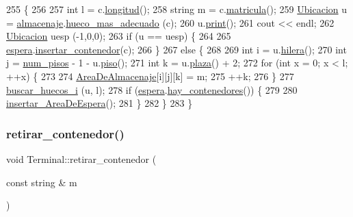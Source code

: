 \begin{DoxyCode}
255                                                        \{
256     
257     \textcolor{keywordtype}{int} l = c.\hyperlink{class_contenedor_a203894805dd0b8347f9884990dab0d9d}{longitud}();
258     \textcolor{keywordtype}{string} m = c.\hyperlink{class_contenedor_aac5839c94f8d3be8a908740a1af0b716}{matricula}();
259     \hyperlink{class_ubicacion}{Ubicacion} u = \hyperlink{class_terminal_a1d87d7b16c4f460eee6f1ab73da90fd2}{almacenaje}.\hyperlink{class_almacenaje_a8a62209a8e83a59eb900913c3dc5f377}{hueco\_mas\_adecuado} (c);
260     u.\hyperlink{class_ubicacion_a6b693a32d8bbd9afce30b11d19b68846}{print}();
261     cout << endl;
262     \hyperlink{class_ubicacion}{Ubicacion} uesp (-1,0,0);
263     \textcolor{keywordflow}{if} (u == uesp) \{
264         
265         \hyperlink{class_terminal_ac9f71207d73c8d05a9d9d6c046f9f8c3}{espera}.\hyperlink{class_espera_a7154136eb8addbeebe5cc1406d6400c0}{insertar\_contenedor}(c);
266     \}
267     \textcolor{keywordflow}{else} \{
268         
269         \textcolor{keywordtype}{int} i = u.\hyperlink{class_ubicacion_abf00d08075e75ac833de7357ebc6f521}{hilera}();
270         \textcolor{keywordtype}{int} j = \hyperlink{class_terminal_ad6cdee7fe26b4443d45b0a18c345a86d}{num\_pisos} - 1 - u.\hyperlink{class_ubicacion_af6099f8de4dee993e4c9119e1f879070}{piso}();
271         \textcolor{keywordtype}{int} k = u.\hyperlink{class_ubicacion_abed323ffb2eace375e80bc395fdaeb39}{plaza}() + 2;
272         \textcolor{keywordflow}{for} (\textcolor{keywordtype}{int} x = 0; x < l; ++x) \{
273     
274             \hyperlink{class_terminal_a50670862a5cdeb0504efd1c45b6416dc}{AreaDeAlmacenaje}[i][j][k] = m;
275             ++k;
276         \}   
277         \hyperlink{class_terminal_a204fc08e3b6f13f75c525f282b023b19}{buscar\_huecos\_i} (u, l);
278         \textcolor{keywordflow}{if} (\hyperlink{class_terminal_ac9f71207d73c8d05a9d9d6c046f9f8c3}{espera}.\hyperlink{class_espera_ae97d5ed76fdcf057835b51a87deaffb9}{hay\_contenedores}()) \{
279         
280             \hyperlink{class_terminal_a672932def16149bd23a95d60956e42a0}{insertar\_AreaDeEspera}();
281         \}
282     \}
283 \}
\end{DoxyCode}
\mbox{\label{class_terminal_a4a5b00174efb9993ead60369d206375b}} 
\subsubsection{\texorpdfstring{retirar\+\_\+contenedor()}{retirar\_contenedor()}}
{\footnotesize\ttfamily void Terminal\+::retirar\+\_\+contenedor (\begin{DoxyParamCaption}\item[{const string \&}]{m }\end{DoxyParamCaption})}



